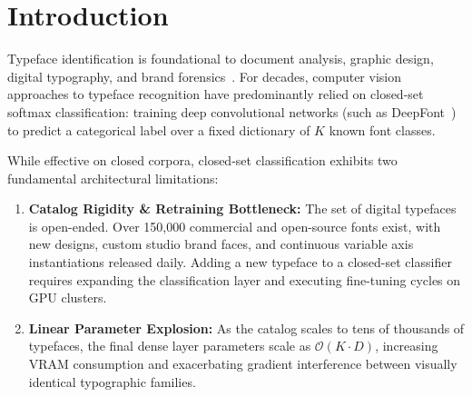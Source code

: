 \documentclass[10pt,twocolumn,letterpaper]{article}
\begin{document}
\section{Introduction}

Typeface identification is foundational to document analysis, graphic design, digital typography, and brand forensics~\cite{chen2014largescale,Wang2015DeepFont}. For decades, computer vision approaches to typeface recognition have predominantly relied on closed-set softmax classification: training deep convolutional networks (such as DeepFont~\cite{Wang2015DeepFont}) to predict a categorical label over a fixed dictionary of $K$ known font classes.

While effective on closed corpora, closed-set classification exhibits two fundamental architectural limitations:
\begin{enumerate}
    \item \textbf{Catalog Rigidity \& Retraining Bottleneck:} The set of digital typefaces is open-ended. Over 150,000 commercial and open-source fonts exist, with new designs, custom studio brand faces, and continuous variable axis instantiations released daily. Adding a new typeface to a closed-set classifier requires expanding the classification layer and executing fine-tuning cycles on GPU clusters.
    \item \textbf{Linear Parameter Explosion:} As the catalog scales to tens of thousands of typefaces, the final dense layer parameters scale as $\mathcal{O}(K \cdot D)$, increasing VRAM consumption and exacerbating gradient interference between visually identical typographic families.
\end{enumerate}
\end{document}
